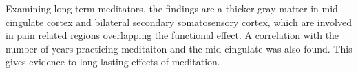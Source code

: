 Examining long term meditators, the findings are a thicker gray matter in mid cingulate cortex and bilateral secondary somatosensory cortex, which are involved in pain related regions overlapping the functional effect. A correlation with the number of years practicing meditaiton and the mid cingulate was also found. This gives evidence to long lasting effects of meditation. \cite{Zeidan2012}




 